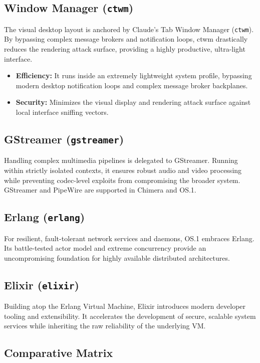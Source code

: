 \documentclass{article}
\begin{document}
\subsection{Window Manager (\texttt{ctwm})}
The visual desktop layout is anchored by Claude's Tab Window Manager (\texttt{ctwm}). By bypassing complex message brokers and notification loops, ctwm drastically reduces the rendering attack surface, providing a highly productive, ultra-light interface.

\begin{itemize}
\item \textbf{Efficiency:} It runs inside an extremely lightweight system profile, bypassing modern desktop notification loops and complex message broker backplanes.
\item \textbf{Security:} Minimizes the visual display and rendering attack surface against local interface sniffing vectors.
\end{itemize}

\subsection{GStreamer (\texttt{gstreamer})}
Handling complex multimedia pipelines is delegated to GStreamer. Running within strictly isolated contexts, it ensures robust audio and video processing while preventing codec-level exploits from compromising the broader system. GStreamer and PipeWire are supported in Chimera and OS.1.

\subsection{Erlang (\texttt{erlang})}
For resilient, fault-tolerant network services and daemons, OS.1 embraces Erlang. Its battle-tested actor model and extreme concurrency provide an uncompromising foundation for highly available distributed architectures.

\subsection{Elixir (\texttt{elixir})}
Building atop the Erlang Virtual Machine, Elixir introduces modern developer tooling and extensibility. It accelerates the development of secure, scalable system services while inheriting the raw reliability of the underlying VM.

\newpage
\subsection{Comparative Matrix}
\end{document}
